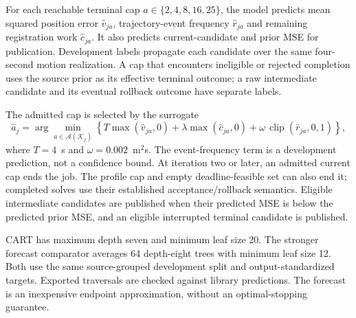 For each reachable terminal cap $a\in\{2,4,8,16,25\}$, the model predicts mean squared position error $\widehat v_{ja}$, trajectory-event frequency $\widehat r_{ja}$ and remaining registration work $\widehat c_{ja}$. It also predicts current-candidate and prior MSE for publication. Development labels propagate each candidate over the same four-second motion realization. A cap that encounters ineligible or rejected completion uses the source prior as its effective terminal outcome; a raw intermediate candidate and its eventual rollback outcome have separate labels.

The admitted cap is selected by the surrogate
\begin{equation}
\widehat a_j=\arg\min_{a\in\mathcal A(\mathcal K_j)}
\left\{T\max(\widehat v_{ja},0)+\lambda\max(\widehat c_{ja},0)
+\omega\,\operatorname{clip}(\widehat r_{ja},0,1)\right\},\label{eq:stop-rule}
\end{equation}
where $T=4$~s and $\omega=0.002$~m$^2$s. The event-frequency term is a development prediction, not a confidence bound. At iteration two or later, an admitted current cap ends the job. The profile cap and empty deadline-feasible set can also end it; completed solves use their established acceptance/rollback semantics. Eligible intermediate candidates are published when their predicted MSE is below the predicted prior MSE, and an eligible interrupted terminal candidate is published.

CART has maximum depth seven and minimum leaf size 20. The stronger forecast comparator averages 64 depth-eight trees with minimum leaf size 12. Both use the same source-grouped development split and output-standardized targets. Exported traversals are checked against library predictions. The forecast is an inexpensive endpoint approximation, without an optimal-stopping guarantee.

